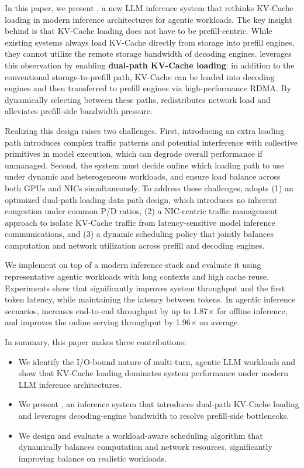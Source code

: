 In this paper, we present \sysname, a new LLM inference system that rethinks KV-Cache loading in modern inference architectures for agentic workloads. The key insight behind \sysname is that KV-Cache loading does not have to be prefill-centric. While existing systems always load KV-Cache directly from storage into prefill engines, they cannot utilize the remote storage bandwidth of decoding engines. \sysname leverages this observation by enabling \textbf{dual-path KV-Cache loading}: in addition to the conventional storage-to-prefill path, KV-Cache can be loaded into decoding engines and then transferred to prefill engines via high-performance RDMA. By dynamically selecting between these paths, \sysname redistributes network load and alleviates prefill-side bandwidth pressure.

Realizing this design raises two challenges.
First, introducing an extra loading path introduces complex traffic patterns and potential interference with collective primitives in model execution, which can degrade overall performance if unmanaged.
Second, the system must decide online which loading path to use under dynamic and heterogeneous workloads, and ensure load balance across both GPUs and NICs simultaneously.
To address these challenges, \sysname adopts (1) an optimized dual-path loading data path design, which introduces no inherent congestion under common P/D ratios, (2) a NIC-centric traffic management approach to isolate KV-Cache traffic from latency-sensitive model inference communications, and (3) a dynamic scheduling policy that jointly balances computation and network utilization across prefill and decoding engines.

We implement \sysname on top of a modern inference stack and evaluate it using representative agentic workloads with long contexts and high cache reuse.
Experiments show that \sysname significantly improves system throughput and the first token latency, while maintaining the latency between tokens. In agentic inference scenarios, \sysname increases end-to-end throughput by up to 1.87$\times$ for offline inference, and improves the online serving throughput by 1.96$\times$ on average.

In summary, this paper makes three contributions:
\begin{itemize}[leftmargin=*]
  \item We identify the I/O-bound nature of multi-turn, agentic LLM workloads and show that KV-Cache loading dominates system performance under modern LLM inference architectures.
  \item We present \sysname, an inference system that introduces dual-path KV-Cache loading and leverages decoding-engine bandwidth to resolve prefill-side bottlenecks.
  \item We design and evaluate a workload-aware scheduling algorithm that dynamically balances computation and network resources, significantly improving balance on realistic workloads.
\end{itemize}

